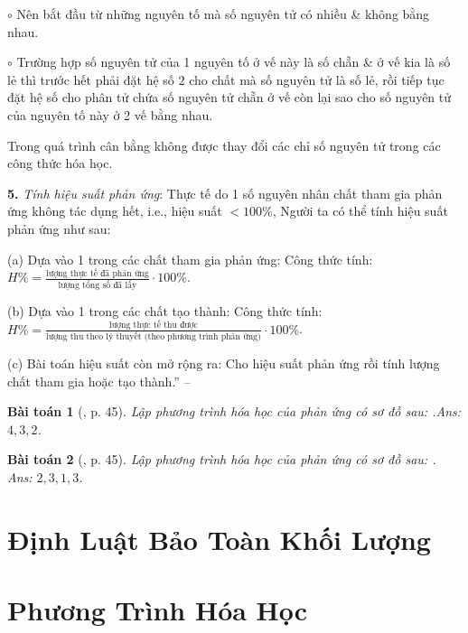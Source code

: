 \documentclass{article}
\numberwithin{equation}{section}
\newtheorem{baitoan}{Bài toán}[section]
\begin{document}
\begin{enumerate*}
\begin{enumerate*}
\begin{enumerate*}
			\item[$\circ$] Nên bắt đầu từ những nguyên tố mà số nguyên tử có nhiều \& không bằng nhau.
			\item[$\circ$] Trường hợp số nguyên tử của 1 nguyên tố ở vế này là số chẵn \& ở vế kia là số lẻ thì trước hết phải đặt hệ số $2$ cho chất mà số nguyên tử là số lẻ, rồi tiếp tục đặt hệ số cho phân tử chứa số nguyên tử chẵn ở vế còn lại sao cho số nguyên tử của nguyên tố này ở 2 vế bằng nhau.
		\end{enumerate*}
	\end{enumerate*}
	Trong quá trình cân bằng không được thay đổi các chỉ số nguyên tử trong các công thức hóa học.
	\item[\textbf{5.}] \textit{Tính hiệu suất phản ứng}: Thực tế do 1 số nguyên nhân chất tham gia phản ứng không tác dụng hết, i.e., hiệu suất $< 100$\%, Người ta có thể tính hiệu suất phản ứng như sau:
	\begin{enumerate*}
		\item[(a)] Dựa vào 1 trong các chất tham gia phản ứng: Công thức tính: $H\% = \frac{\mbox{lượng thực tế đã phản ứng}}{\mbox{lượng tổng số đã lấy}}\cdot100\%$.
		\item[(b)] Dựa vào 1 trong các chất tạo thành: Công thức tính: $H\% = \frac{\mbox{lượng thực tế thu được}}{\mbox{lượng thu theo lý thuyết (theo phương trình phản ứng)}}\cdot100\%$.
		\item[(c)] Bài toán hiệu suất còn mở rộng ra: Cho hiệu suất phản ứng rồi tính lượng chất tham gia hoặc tạo thành.'' -- \cite[Chap. 2, pp. 44--46]{An_400_BT_Hoa_Hoc_8_2020}
	\end{enumerate*}
\end{enumerate*}

\begin{baitoan}[\cite{An_400_BT_Hoa_Hoc_8_2020}, p. 45]
	Lập phương trình hóa học của phản ứng có sơ đồ sau: \emph{}.\hfill\textsf{Ans:} $4,3,2$.
\end{baitoan}

\begin{baitoan}[\cite{An_400_BT_Hoa_Hoc_8_2020}, p. 45]
	Lập phương trình hóa học của phản ứng có sơ đồ sau: \emph{}.\\\mbox{}\hfill\textsf{Ans:} $2,3,1,3$.
\end{baitoan}








\section{Định Luật Bảo Toàn Khối Lượng}


\section{Phương Trình Hóa Học}


\printbibliography[heading=bibintoc]
	
\end{document}
